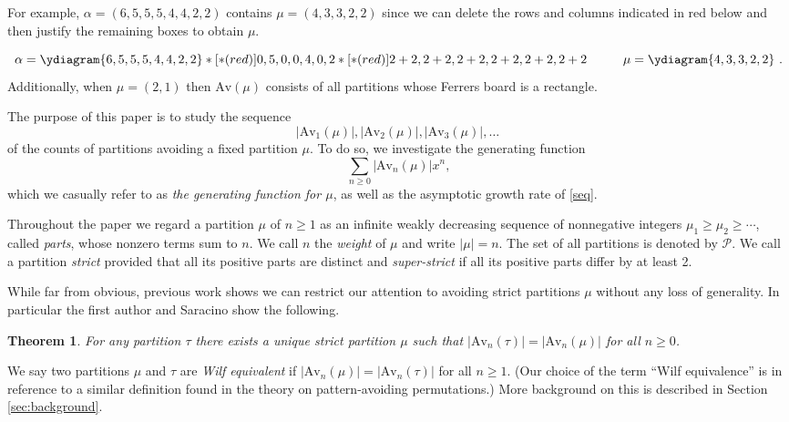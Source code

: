\documentclass{article}
\theoremstyle{plain}
\newtheorem{theorem}{Theorem}[section]
\theoremstyle{definition}
\newcommand{\Av}{\text{Av}}
\renewcommand{\P}{\mathcal{P}}
\begin{document}
For example, $\alpha = (6,5,5,5,4,4,2,2)$ contains $\mu=(4,3,3,2,2)$ since we can delete the rows and columns indicated in red below and then justify the remaining boxes to obtain $\mu$.  

$$\alpha=\ydiagram{6,5,5,5,4,4,2,2}*[*(red)]{0,5,0,0,4,0,2}*[*(red)]{2+2,2+2,2+2,2+2,2+2,2+2}\hspace{1cm} \mu = \ydiagram{4,3,3,2,2}  \ .$$
Additionally, when $\mu = (2,1)$ then $\Av(\mu)$ consists of all partitions whose Ferrers board is a rectangle.  

The purpose of this paper is to study the sequence 
\begin{equation}\label{seq}
|\Av_1(\mu)|, |\Av_2(\mu)|,|\Av_3(\mu)|,\ldots\ 
\end{equation}
of the counts of partitions avoiding a fixed partition $\mu$. To do so, we investigate the generating function
\begin{equation}\label{gf}
    \sum_{n\geq 0}|\Av_n(\mu)|x^n,
\end{equation}
which we casually refer to as \emph{the generating function for $\mu$}, as well as the asymptotic growth rate of \eqref{seq}. 


Throughout the paper we regard a partition $\mu$ of $n\geq 1$ as an infinite weakly decreasing sequence of nonnegative integers $\mu_1\geq \mu_2\geq \cdots$, called \emph{parts}, whose nonzero terms sum to $n$.    We call $n$ the \emph{weight} of $\mu$ and write $|\mu|=n$.  The set of all partitions is denoted by $\P$. We call a partition \emph{strict} provided that all its positive parts are distinct and \emph{super-strict} if all its positive parts differ by at least 2.


While far from obvious, previous work shows we can restrict our attention to avoiding strict partitions $\mu$ without any loss of generality. In particular the first author and Saracino show \cites{Bloom:Rook-2018,Bloom:On-cr2018} the following.

\begin{theorem}\label{thm:strict}
For any partition $\tau$ there exists a unique strict partition $\mu$ such that $|\Av_n(\tau)| = |\Av_n(\mu)|$ for all $n\geq 0$.
\end{theorem}
We say two partitions $\mu$ and $\tau$ are \emph{Wilf equivalent} if $|\Av_n(\mu)| = |\Av_n(\tau)|$ for all $n\geq 1$. (Our choice of the term ``Wilf equivalence'' is in reference to a similar definition found in the theory on pattern-avoiding permutations.)  More background on this is described in Section \ref{sec:background}.
\end{document}
